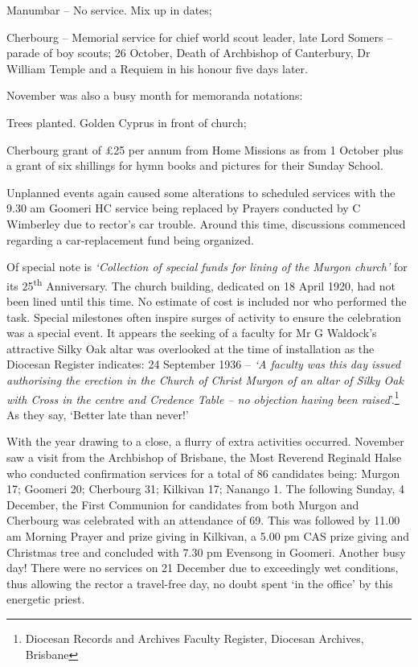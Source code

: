 Manumbar -- No service. Mix up in dates;

Cherbourg -- Memorial service for chief world scout leader, late Lord Somers -- parade of boy scouts; 26 October, Death of Archbishop of Canterbury, Dr William Temple and a Requiem in his honour five days later.

November was also a busy month for memoranda notations:

Trees planted. Golden Cyprus in front of church;

Cherbourg grant of £25 per annum from Home Missions as from 1 October plus a grant of six shillings for hymn books and pictures for their Sunday School.

Unplanned events again caused some alterations to scheduled services with the 9.30 am Goomeri HC service being replaced by Prayers conducted by C Wimberley due to rector's car trouble. Around this time, discussions commenced regarding a car-replacement fund being organized.

Of special note is \emph{`Collection of special funds for lining of the Murgon church'} for its 25\textsuperscript{th} Anniversary. The church building, dedicated on 18 April 1920, had not been lined until this time. No estimate of cost is included nor who performed the task. Special milestones often inspire surges of activity to ensure the celebration was a special event. It appears the seeking of a faculty for Mr G Waldock's attractive Silky Oak altar was overlooked at the time of installation as the Diocesan Register indicates: 24 September 1936 -- \emph{`A faculty was this day issued authorising the erection in the Church of Christ Murgon of an altar of Silky Oak with Cross in the centre and Credence Table -- no objection having been raised}'.\footnote{Diocesan Records and Archives Faculty Register, Diocesan Archives, Brisbane} As they say, `Better late than never!'

With the year drawing to a close, a flurry of extra activities occurred. November saw a visit from the Archbishop of Brisbane, the Most Reverend Reginald Halse who conducted confirmation services for a total of 86 candidates being: Murgon 17; Goomeri 20; Cherbourg 31; Kilkivan 17; Nanango 1. The following Sunday, 4 December, the First Communion for candidates from both Murgon and Cherbourg was celebrated with an attendance of 69. This was followed by 11.00 am Morning Prayer and prize giving in Kilkivan, a 5.00 pm CAS prize giving and Christmas tree and concluded with 7.30 pm Evensong in Goomeri. Another busy day! There were no services on 21 December due to exceedingly wet conditions, thus allowing the rector a travel-free day, no doubt spent `in the office' by this energetic priest.

